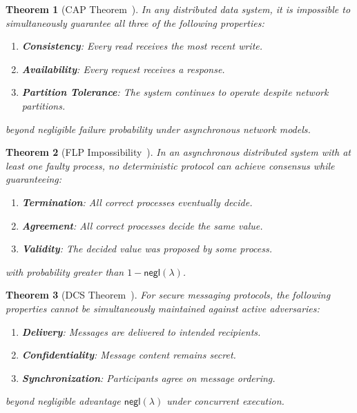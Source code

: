 \documentclass[preprint,12pt]{elsarticle}
\newtheorem{theorem}{Theorem}[section]
\begin{document}
            \begin{theorem}[CAP Theorem~\cite{brewer2000towards}]\label{thm:cap_theorem}
            In any distributed data system, it is impossible to simultaneously guarantee all three of the following properties:
            \begin{enumerate}
                \item \textbf{Consistency}: Every read receives the most recent write.
                \item \textbf{Availability}: Every request receives a response.
                \item \textbf{Partition Tolerance}: The system continues to operate despite network partitions.
            \end{enumerate}
            beyond negligible failure probability under asynchronous network models.
            \end{theorem}

            \begin{theorem}[FLP Impossibility~\cite{fischer1985impossibility}]\label{thm:flp_impossibility}
            In an asynchronous distributed system with at least one faulty process, no deterministic protocol can achieve consensus while guaranteeing:
            \begin{enumerate}
                \item \textbf{Termination}: All correct processes eventually decide.
                \item \textbf{Agreement}: All correct processes decide the same value.
                \item \textbf{Validity}: The decided value was proposed by some process.
            \end{enumerate}
            with probability greater than $1 - \mathsf{negl}(\lambda)$.
            \end{theorem}

            \begin{theorem}[DCS Theorem~\cite{dcs2020}]\label{thm:dcs_theorem}
            For secure messaging protocols, the following properties cannot be simultaneously maintained against active adversaries:
            \begin{enumerate}
                \item \textbf{Delivery}: Messages are delivered to intended recipients.
                \item \textbf{Confidentiality}: Message content remains secret.
                \item \textbf{Synchronization}: Participants agree on message ordering.
            \end{enumerate}
            beyond negligible advantage $\mathsf{negl}(\lambda)$ under concurrent execution.
            \end{theorem}
\end{document}
